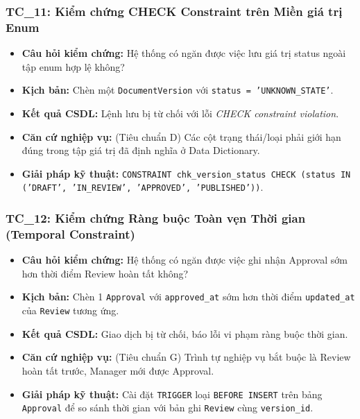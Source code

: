 \subsubsection*{TC\_11: Kiểm chứng CHECK Constraint trên Miền giá trị Enum}
\begin{itemize}
    \item \textbf{Câu hỏi kiểm chứng:} Hệ thống có ngăn được việc lưu giá trị status ngoài tập enum hợp lệ không?
    \item \textbf{Kịch bản:} Chèn một \texttt{DocumentVersion} với \texttt{status = 'UNKNOWN\_STATE'}.
    \item \textbf{Kết quả CSDL:} Lệnh lưu bị từ chối với lỗi \textit{CHECK constraint violation}.
    \item \textbf{Căn cứ nghiệp vụ:} (Tiêu chuẩn D) Các cột trạng thái/loại phải giới hạn đúng trong tập giá trị đã định nghĩa ở Data Dictionary.
    \item \textbf{Giải pháp kỹ thuật:} \texttt{CONSTRAINT chk\_version\_status CHECK (status IN ('DRAFT', 'IN\_REVIEW', 'APPROVED', 'PUBLISHED'))}.
\end{itemize}

\subsubsection*{TC\_12: Kiểm chứng Ràng buộc Toàn vẹn Thời gian (Temporal Constraint)}
\begin{itemize}
    \item \textbf{Câu hỏi kiểm chứng:} Hệ thống có ngăn được việc ghi nhận Approval sớm hơn thời điểm Review hoàn tất không?
    \item \textbf{Kịch bản:} Chèn 1 \texttt{Approval} với \texttt{approved\_at} sớm hơn thời điểm \texttt{updated\_at} của \texttt{Review} tương ứng.
    \item \textbf{Kết quả CSDL:} Giao dịch bị từ chối, báo lỗi vi phạm ràng buộc thời gian.
    \item \textbf{Căn cứ nghiệp vụ:} (Tiêu chuẩn G) Trình tự nghiệp vụ bắt buộc là Review hoàn tất trước, Manager mới được Approval.
    \item \textbf{Giải pháp kỹ thuật:} Cài đặt \texttt{TRIGGER} loại \texttt{BEFORE INSERT} trên bảng \texttt{Approval} để so sánh thời gian với bản ghi \texttt{Review} cùng \texttt{version\_id}.
\end{itemize}
